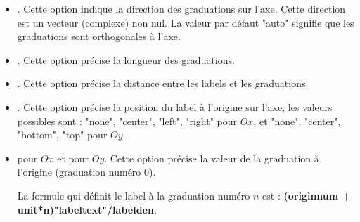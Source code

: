 \begin{itemize}
\begin{itemize}
            \item {}. Cette option indique la direction des graduations sur l'axe. Cette direction est un vecteur (complexe) non nul. La valeur par défaut "auto" signifie que les graduations sont orthogonales à l'axe.
            \item {}. Cette option précise la longueur des graduations.
            \item {}. Cette option précise la distance entre les labels et les graduations.
            \item {}. Cette option précise la position du label à l'origine sur l'axe, les valeurs possibles sont : "none", "center", "left", "right" pour $Ox$, et "none", "center", "bottom", "top" pour $Oy$.
            \item {} pour $Ox$ et  pour $Oy$. Cette option précise la valeur de la graduation à l'origine (graduation numéro $0$). 
            
            La formule qui définit le label à la graduation numéro $n$ est : \textbf{(originnum + unit*n)"labeltext"/labelden}.


\end{itemize}
\end{itemize}
